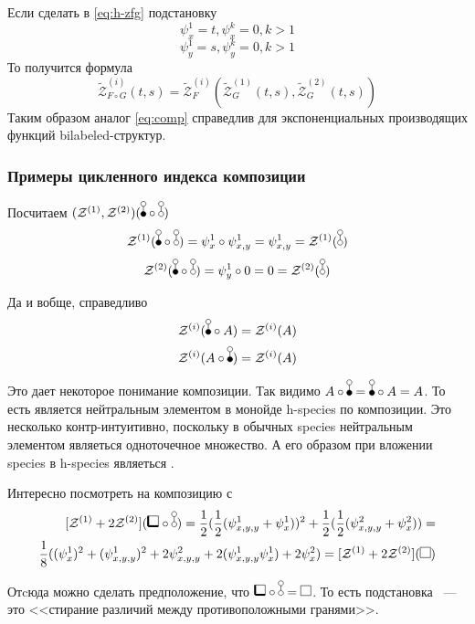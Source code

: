 \begin{remark}
Если сделать в \ref{eq:h-zfg} подстановку 
$$
\psi_{x}^1 = t, \psi_{x}^k = 0, k>1
$$
$$
\psi_y^1 = s, \psi_y^k = 0, k>1
$$
То получится формула
$$
\tilde{\mathcal Z}^{(i)}_{F \circ G} (t, s) = 
	\tilde{\mathcal Z}_F^{(i)} (
		\tilde{\mathcal Z}_G^{(1)} (t, s), 
		\tilde{\mathcal Z}_G^{(2)} (t, s))
$$
Таким образом аналог \ref{eq:comp} справедлив для
экспоненциальных производящих функций bilabeled-структур.
\end{remark}

\subsubsection{Примеры цикленного индекса композиции}
\begin{example}
Посчитаем $(\mathcal Z^{(1)}, \mathcal Z^{(2)})(\dB \circ \dA)$
$$
\mathcal Z^{(1)}(\dB \circ \dA) = \psi_{x}^1 \circ \psi_{x, y}^1 = \psi_{x, y}^1
= \mathcal Z^{(1)}(\dA)
$$ 
$$
\mathcal Z^{(2)}(\dB \circ \dA) = \psi_{y}^1 \circ 0 = 0 = \mathcal Z^{(2)}(\dA)
$$
\end{example}
\begin{example}
Да и вобще, справедливо
$$
\mathcal Z^{(i)}(\dB \circ A) = \mathcal Z^{(i)}(A)
$$ 
$$
\mathcal Z^{(i)}(A \circ \dB) = \mathcal Z^{(i)}(A)
$$
\end{example}
\begin{remark}
Это дает некоторое понимание композиции. Так видимо $A \circ \dB = \dB \circ A =
A$. То есть \dB является нейтральным элементом в монойде h-species по
композиции.
Это несколько контр-интуитивно, поскольку в обычных species нейтральным
элементом являеться одноточечное множество. А его образом при вложении species в
h-species являеться \dA.
\end{remark}
\begin{example}
Интересно посмотреть на композицию с \dA
\begin{equation}
\begin{split}
\Zfull(\dBB \circ \dA) = \frac{1}{2} (\frac{1}{2}(\psi_{x,y,y}^1 +
\psi_{x}^1))^2 + \frac{1}{2} (\frac{1}{2}(\psi_{x,y,y}^2 +
\psi_{x}^2)) = \\
\frac{1}{8}((\psi_{x}^1)^2 + (\psi_{x, y, y}^1)^2 +
2\psi_{x, y, y}^2 + 2(\psi_{x, y, y}^1\psi_{x}^1) + 2\psi_{x}^2) =
\Zfull(\dAA)
\end{split}
\end{equation}
\begin{remark}
Отcюда можно сделать предположение, что $\dBB \circ \dA = \dAA$.
То есть подстановка \dA~--- это <<стирание различий между противоположными
гранями>>.
\end{remark}
\end{example}

